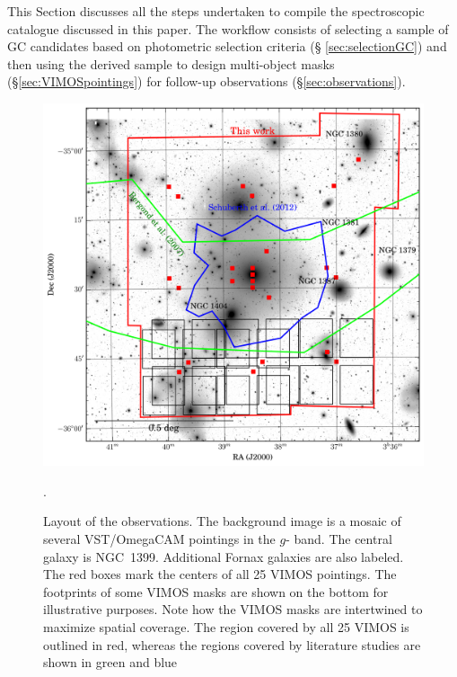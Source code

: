 \documentclass[useAMS,usenatbib]{mn2e}
\begin{document}
This Section discusses all the steps undertaken to compile the spectroscopic catalogue discussed in this paper. The 
workflow consists of selecting a sample of GC candidates based on photometric selection criteria (\S 
\ref{sec:selectionGC}) and then using the derived sample to design multi-object masks (\S \ref{sec:VIMOSpointings}) for follow-up 
observations (\S \ref{sec:observations}).

\begin{figure}
\centering
\includegraphics[scale=0.7]{figures/fov.png} 
\caption{Layout of the observations. The background image is a mosaic of several VST/OmegaCAM pointings in the $g$-
band. The central galaxy is NGC~1399. Additional Fornax galaxies are also labeled. The red boxes mark the centers of all 
25 VIMOS pointings. The footprints of some VIMOS masks are shown on the bottom for illustrative purposes. Note how 
the VIMOS masks are intertwined to maximize spatial coverage. The region covered by all 25 VIMOS is outlined in red, 
whereas the regions covered by literature studies are shown in green \citep{Bergond07} and blue \citep{Schuberth}}.
\label{fig:fov}
\end{figure}
\end{document}
